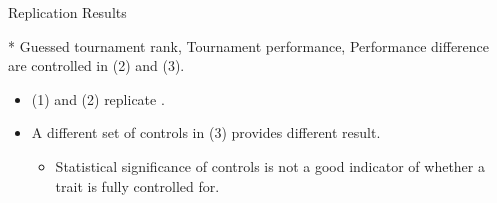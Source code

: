 \begin{frame}{Replication Results}
    \begin{table}[]
\centering
\label{tab:gender1}
\end{table}
\small{\color{blue}* Guessed tournament rank, Tournament performance, Performance difference are controlled in (2) and (3).}
\vspace{3mm}
\begin{itemize}
    \item (1) and (2) replicate \cite{niederle2007women}.
    \item A different set of controls in (3) provides different result.
    \begin{itemize}
        \item Statistical significance of controls is not a good indicator of whether a trait is fully controlled for.
    \end{itemize}
\end{itemize}
\end{frame}

